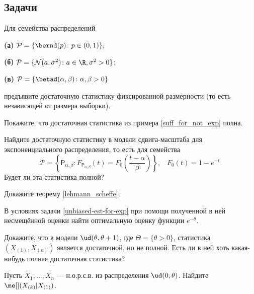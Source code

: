 \subsection*{Задачи}

\begin{problem}
	Для семейства распределений
	
	\textbf{(а)} $\mathcal{P} = \{\bernd(p)\colon p \in (0, 1)\}$;

	\textbf{(б)} $\mathcal{P} = \{\mathcal{N}(a, \sigma^2)\colon a \in \R, \sigma^2 > 0\}$;

	\textbf{(в)} $\mathcal{P} = \{\betad(\alpha, \beta)\colon \alpha, \beta > 0\}$ 
	
	предъявите достаточную статистику фиксированной размерности (то есть независящей от размера выборки).
\end{problem}

\begin{problem}
    Покажите, что достаточная статистика из примера \ref{suff_for_not_exp} полна.
\end{problem}

\begin{problem}
    Найдите достаточную статистику в модели сдвига-масштаба для экспоненциального распределения, то есть для семейства
    \[
    \mathcal{P} = \left\{\mathsf{P}_{\alpha, \beta}\colon F_{\mathsf{P}_{\alpha, \beta}}(t) = F_0\left(\frac{t-\alpha}{\beta}\right)\right\},\;\;\;F_0(t) = 1 - e^{-t}.
    \]
    Будет ли эта статистика полной?
\end{problem}

\begin{problem}
    Докажите теорему \ref{lehmann_scheffe}.
\end{problem}

\begin{problem}
	В условиях задачи \ref{unbiased-est-for-exp} при помощи полученной в ней несмещённой оценки найти оптимальную оценку функции $e^{-\theta}$.
\end{problem}

\begin{problem}
	Докажите, что в модели $\ud(\theta, \theta + 1)$, где $\Theta = \{\theta > 0\}$, статистика $(X_{(1)}, X_{(n)})$ является достаточной, но не полной. Есть ли в ней хоть какая-нибудь полная достаточная статистика?
\end{problem}

\begin{problem}
    Пусть $X_1, \ldots, X_n$ --- н.о.р.с.в. из распределения $\ud(0, \theta)$. Найдите $\me[](X_{(k)} | X_{(1)})$.
\end{problem}

